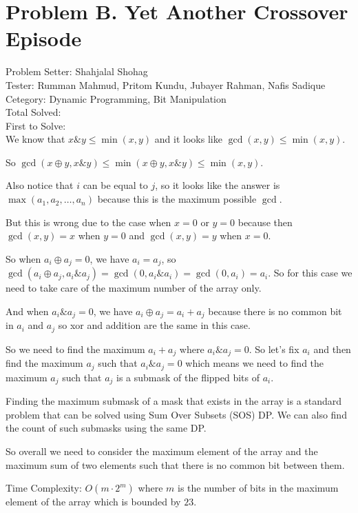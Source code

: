 \section*{Problem B. Yet Another Crossover Episode}

Problem Setter: Shahjalal Shohag \\
Tester: Rumman Mahmud, Pritom Kundu, Jubayer Rahman, Nafis Sadique \\
Cetegory: Dynamic Programming, Bit Manipulation \\
Total Solved:  \\
First to Solve: \\

We know that $x \& y \le \min(x, y)$ and it looks like $\gcd(x, y) \le \min(x, y)$.

So $\gcd(x \oplus y, x \& y) \le \min(x \oplus y, x \& y) \le \min(x, y)$.

Also notice that $i$ can be equal to $j$, so it looks like the answer is $\max({a_1, a_2, \ldots, a_n})$ because this is the maximum possible $\gcd$.

But this is wrong due to the case when $x = 0$ or $y = 0$ because then $\gcd(x, y) = x$ when $y = 0$ and $\gcd(x, y) = y$ when $x = 0$.

So when $a_i \oplus a_j = 0$, we have $a_i = a_j$, so $\gcd(a_i \oplus a_j, a_i \& a_j) = \gcd(0, a_i \& a_i) = \gcd(0, a_i) = a_i$.
So for this case we need to take care of the maximum number of the array only.

And when $a_i \& a_j = 0$, we have $a_i \oplus a_j = a_i + a_j$ because there is no common bit in $a_i$ and $a_j$
so xor and addition are the same in this case.

So we need to find the maximum $a_i + a_j$ where $a_i \& a_j = 0$. So let's fix $a_i$
and then find the maximum $a_j$ such that $a_i \& a_j = 0$ which means we 
need to find the maximum $a_j$ such that $a_j$ is a submask of the flipped bits of $a_i$.

Finding the maximum submask of a mask that exists in the array is a standard problem that can be solved
using Sum Over Subsets (SOS) DP. We can also find the count of such submasks using the same DP.

So overall we need to consider the maximum element of the array and the maximum sum of two elements such that there is no common bit between them.

Time Complexity: $O(m \cdot 2^m)$ where $m$ is the number of bits in the maximum element of the array which is bounded by $23$.
